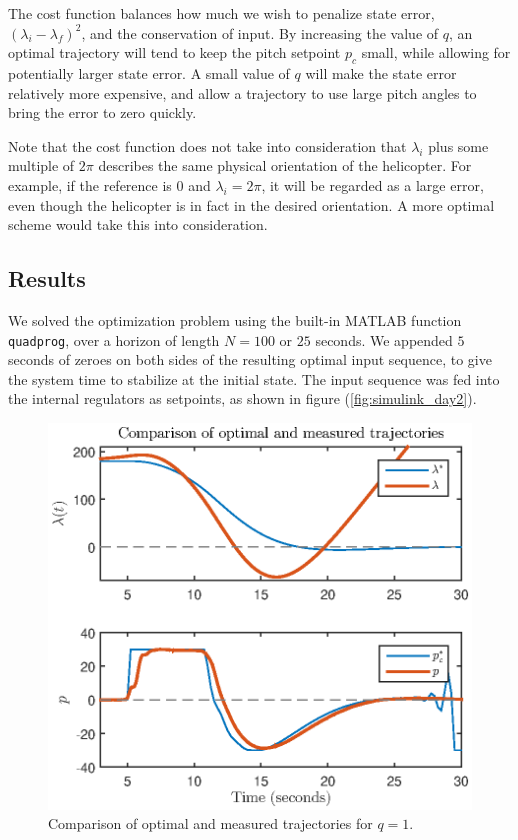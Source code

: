 The cost function balances how much we wish to penalize state error, $(\lambda_i - \lambda_f)^2$, and the conservation of input. By increasing the value of $q$, an optimal trajectory will tend to keep the pitch setpoint $p_c$ small, while allowing for potentially larger state error. A small value of $q$ will make the state error relatively more expensive, and allow a trajectory to use large pitch angles to bring the error to zero quickly.

Note that the cost function does not take into consideration that $\lambda_i$ plus some multiple of $2\pi$ describes the same physical orientation of the helicopter. For example, if the reference is $0$ and $\lambda_i = 2\pi$, it will be regarded as a large error, even though the helicopter is in fact in the desired orientation. A more optimal scheme would take this into consideration.

\subsection{Results}

We solved the optimization problem using the built-in MATLAB function \texttt{quadprog}, over a horizon of length $N=100$ or $25$ seconds. We appended $5$ seconds of zeroes on both sides of the resulting optimal input sequence, to give the system time to stabilize at the initial state. The input sequence was fed into the internal regulators as setpoints, as shown in figure (\ref{fig:simulink_day2}).

\begin{figure}[htb]
    \centering
    \includegraphics{figures/day2/plot_day2}
    \caption{Comparison of optimal and measured trajectories for $q = 1$.}
    \label{fig:day2_plot}
\end{figure}

